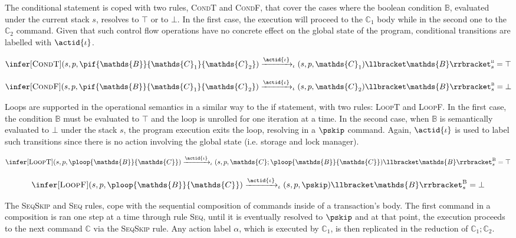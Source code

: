 The conditional statement is coped with two rules, \textsc{CondT} and \textsc{CondF}, that cover the cases where the boolean condition $\mathds{B}$, evaluated under the current stack $s$, resolves to $\top$ or to $\bot$. In the first case, the execution will proceed to the $\mathds{C}_1$ body while in the second one to the $\mathds{C}_2$ command. Given that such control flow operations have no concrete effect on the global state of the program, conditional transitions are labelled with $\actid{\iota}$.

\[
\infer[\textsc{CondT}]
{
	(s, p, \pif{\mathds{B}}{\mathds{C}_1}{\mathds{C}_2})
	\xrightarrow{\actid{\iota}}_\iota
	(s, p, \mathds{C}_1)
}
{
	\llbracket \mathds{B} \rrbracket_s^\textsc{b} = \top
}
\]

\[
\infer[\textsc{CondF}]
{
	(s, p, \pif{\mathds{B}}{\mathds{C}_1}{\mathds{C}_2})
	\xrightarrow{\actid{\iota}}_\iota
	(s, p, \mathds{C}_2)
}
{
	\llbracket \mathds{B} \rrbracket_s^\textsc{b} = \bot
}
\]

Loops are supported in the operational semantics in a similar way to the if statement, with two rules: \textsc{LoopT} and \textsc{LoopF}. In the first case, the condition $\mathds{B}$ must be evaluated to $\top$ and the loop is unrolled for one iteration at a time. In the second case, when $\mathds{B}$ is semantically evaluated to $\bot$ under the stack $s$, the program execution exits the loop, resolving in a $\pskip$ command. Again, $\actid{\iota}$ is used to label such transitions since there is no action involving the global state (i.e. storage and lock manager).

\[
\infer[\textsc{LoopT}]
{
	(s, p, \ploop{\mathds{B}}{\mathds{C}})
	\xrightarrow{\actid{\iota}}_\iota
	(s, p, \mathds{C}; \ploop{\mathds{B}}{\mathds{C}})
}
{
	\llbracket \mathds{B} \rrbracket_s^\textsc{B} = \top
}
\]

\[
\infer[\textsc{LoopF}]
{
	(s, p, \ploop{\mathds{B}}{\mathds{C}})
	\xrightarrow{\actid{\iota}}_\iota
	(s, p, \pskip)
}
{
	\llbracket \mathds{B} \rrbracket_s^\textsc{B} = \bot
}
\]

The \textsc{SeqSkip} and \textsc{Seq} rules, cope with the sequential composition of commands inside of a transaction's body. The first command in a composition is ran one step at a time through rule \textsc{Seq}, until it is eventually resolved to $\pskip$ and at that point, the execution proceeds to the next command $\mathds{C}$ via the \textsc{SeqSkip} rule. Any action label $\alpha$, which is executed by $\mathds{C}_1$, is then replicated in the reduction of $\mathds{C}_1 ; \mathds{C}_2$.

